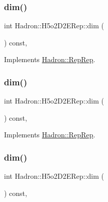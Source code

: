 \subsubsection{\texorpdfstring{dim()}{dim()}\hspace{0.1cm}{\footnotesize\ttfamily [3/5]}}
{\footnotesize\ttfamily int Hadron\+::\+H5o2\+D2\+E\+Rep\+::dim (\begin{DoxyParamCaption}{ }\end{DoxyParamCaption}) const\hspace{0.3cm}{\ttfamily [inline]}, {\ttfamily [virtual]}}



Implements \mbox{\hyperlink{structHadron_1_1RepRep_a92c8802e5ed7afd7da43ccfd5b7cd92b}{Hadron\+::\+Rep\+Rep}}.

\mbox{\label{structHadron_1_1H5o2D2ERep_a40f428f685690d7f21b349010893970c}} 
\subsubsection{\texorpdfstring{dim()}{dim()}\hspace{0.1cm}{\footnotesize\ttfamily [4/5]}}
{\footnotesize\ttfamily int Hadron\+::\+H5o2\+D2\+E\+Rep\+::dim (\begin{DoxyParamCaption}{ }\end{DoxyParamCaption}) const\hspace{0.3cm}{\ttfamily [inline]}, {\ttfamily [virtual]}}



Implements \mbox{\hyperlink{structHadron_1_1RepRep_a92c8802e5ed7afd7da43ccfd5b7cd92b}{Hadron\+::\+Rep\+Rep}}.

\mbox{\label{structHadron_1_1H5o2D2ERep_a40f428f685690d7f21b349010893970c}} 
\subsubsection{\texorpdfstring{dim()}{dim()}\hspace{0.1cm}{\footnotesize\ttfamily [5/5]}}
{\footnotesize\ttfamily int Hadron\+::\+H5o2\+D2\+E\+Rep\+::dim (\begin{DoxyParamCaption}{ }\end{DoxyParamCaption}) const\hspace{0.3cm}{\ttfamily [inline]}, {\ttfamily [virtual]}}



